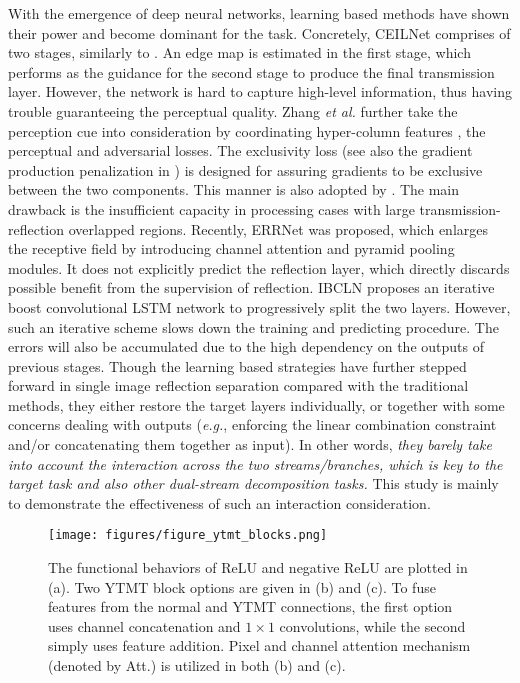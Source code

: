 \documentclass{article}
\begin{document}
With the emergence of deep neural networks, learning based methods \cite{DBLP:conf/iccv/FanYHCW17, DBLP:conf/cvpr/ZhangNC18a,DBLP:conf/eccv/YangGLS18, DBLP:conf/cvpr/WeiYFW019, DBLP:conf/cvpr/LiY0LH20,DBLP:conf/cvpr/WenT0LHH19} have shown their power and become dominant for the task. Concretely, CEILNet \cite{DBLP:conf/iccv/FanYHCW17} comprises of two stages, similarly to \cite{DBLP:journals/pami/LevinW07,DBLP:conf/icip/WanSHK16}. An edge map is estimated in the first stage, which performs as the guidance for the second stage to produce the final transmission layer. However, the network is hard to capture high-level information, thus having trouble guaranteeing the perceptual quality. Zhang \emph{et al.} \cite{DBLP:conf/cvpr/ZhangNC18a} further take the perception cue into consideration by coordinating hyper-column features \cite{DBLP:conf/cvpr/HariharanAGM15}, the perceptual and adversarial losses. The exclusivity loss (see also the gradient production penalization in \cite{DBLP:journals/tog/Freeman15}) is designed for assuring gradients to be exclusive between the two components. This manner is also adopted by \cite{DBLP:conf/cvpr/WeiYFW019}. The main drawback is the insufficient capacity in processing cases with large transmission-reflection overlapped regions. Recently, ERRNet \cite{DBLP:conf/cvpr/WeiYFW019} 
was proposed, which enlarges the receptive field by introducing channel attention and pyramid pooling modules. It does not explicitly predict the reflection layer, which directly discards possible benefit from the supervision of reflection. IBCLN \cite{DBLP:conf/cvpr/LiY0LH20} proposes an iterative boost convolutional LSTM network to progressively split the two layers. However, such an iterative scheme slows down the training and predicting procedure. The errors will also be accumulated due to the high dependency on the outputs of previous stages. Though the learning based strategies have further stepped forward in single image reflection separation compared with the traditional methods, they either restore the target layers individually, or together with some concerns dealing with outputs (\emph{e.g.}, enforcing the linear combination constraint and/or concatenating them together as input). In other words, \emph{they barely take into account the interaction across the two streams/branches, which is key to the target task and also other dual-stream decomposition tasks.} This study is mainly to demonstrate the effectiveness of such an interaction consideration. 

\begin{figure}[t]
	\centering
	\texttt{[image: figures/figure\_ytmt\_blocks.png]}
	\caption{The functional behaviors of ReLU and negative ReLU are plotted in (a). Two YTMT block options are given in (b) and (c). To fuse features from the normal and YTMT connections, the first option uses channel concatenation and $1\times1$ convolutions, while the second simply uses feature addition. Pixel and channel attention mechanism (denoted by Att.) is utilized in both (b) and (c).}
	\label{figure_ytmt_blocks}
\end{figure}
\end{document}
